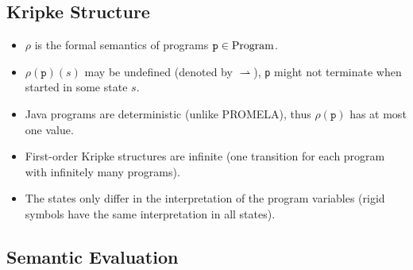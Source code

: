 	\subsection{Kripke Structure}

		\begin{itemize}
			\item \(\rho\) is the formal semantics of programs \( \texttt{p} \in \operatorname{Program} \).
			\item \( \rho(\texttt{p})(s) \) may be undefined (denoted by \( \rightharpoonup \)), \texttt{p} might not terminate when started in some state \(s\).
			\item Java programs are deterministic (unlike PROMELA), thus \( \rho(\texttt{p}) \) has at most one value.
			\item First-order Kripke structures are infinite (one transition for each program with infinitely many programs).
			\item The states only differ in the interpretation of the program variables (rigid symbols have the same interpretation in all states).
		\end{itemize}

	\subsection{Semantic Evaluation}
